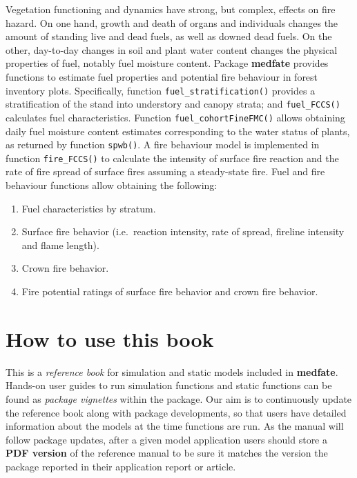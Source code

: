 \documentclass[]{book}
\providecommand{\tightlist}{%
  \setlength{\itemsep}{0pt}\setlength{\parskip}{0pt}}
\begin{document}
Vegetation functioning and dynamics have strong, but complex, effects on fire hazard. On one hand, growth and death of organs and individuals changes the amount of standing live and dead fuels, as well as downed dead fuels. On the other, day-to-day changes in soil and plant water content changes the physical properties of fuel, notably fuel moisture content. Package \textbf{medfate} provides functions to estimate fuel properties and potential fire behaviour in forest inventory plots. Specifically, function \texttt{fuel\_stratification()} provides a stratification of the stand into understory and canopy strata; and \texttt{fuel\_FCCS()} calculates fuel characteristics. Function \texttt{fuel\_cohortFineFMC()} allows obtaining daily fuel moisture content estimates corresponding to the water status of plants, as returned by function \texttt{spwb()}. A fire behaviour model is implemented in function \texttt{fire\_FCCS()} to calculate the intensity of surface fire reaction and the rate of fire spread of surface fires assuming a steady-state fire. Fuel and fire behaviour functions allow obtaining the following:

\begin{enumerate}
\def\labelenumi{\arabic{enumi}.}
\tightlist
\item
  Fuel characteristics by stratum.
\item
  Surface fire behavior (i.e.~reaction intensity, rate of spread, fireline intensity and flame length).
\item
  Crown fire behavior.
\item
  Fire potential ratings of surface fire behavior and crown fire behavior.
\end{enumerate}

\hypertarget{how-to-use-this-book}{%
\section{How to use this book}\label{how-to-use-this-book}}

This is a \emph{reference book} for simulation and static models included in \textbf{medfate}. Hands-on user guides to run simulation functions and static functions can be found as \emph{package vignettes} within the package. Our aim is to continuously update the reference book along with package developments, so that users have detailed information about the models at the time functions are run. As the manual will follow package updates, after a given model application users should store a \textbf{PDF version} of the reference manual to be sure it matches the version the package reported in their application report or article.
\end{document}
